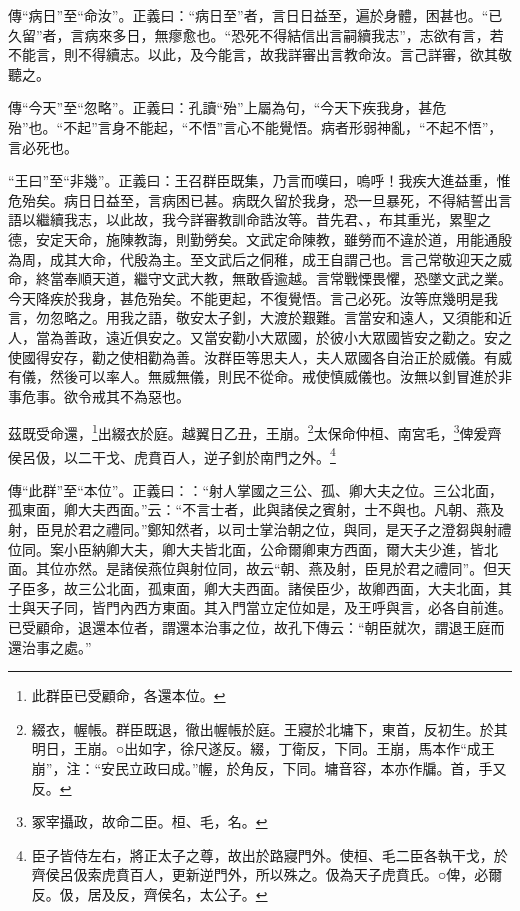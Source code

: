 {\noindent\zhuan{}\fzbyks 傳“病日”至“命汝”。正義曰：“病日至”者，言日日益至，遍於身體，困甚也。“已久留”者，言病來多日，無瘳愈也。“恐死不得結信出言嗣續我志”，志欲有言，若不能言，則不得續志。以此，及今能言，故我詳審出言教命汝。言己詳審，欲其敬聽之。 \par}

{\noindent\zhuan{}\fzbyks 傳“今天”至“忽略”。正義曰：孔讀“殆”上屬為句，“今天下疾我身，甚危殆”也。“不起”言身不能起，“不悟”言心不能覺悟。病者形弱神亂，“不起不悟”，言必死也。 \par}

{\noindent\shu{}\fzkt “王曰”至“非幾”。正義曰：王召群臣既集，乃言而嘆曰，嗚呼！我疾大進益重，惟危殆矣。病日日益至，言病困已甚。病既久留於我身，恐一旦暴死，不得結誓出言語以繼續我志，以此故，我今詳審教訓命誥汝等。昔先君、，布其重光，累聖之德，安定天命，施陳教誨，則勤勞矣。文武定命陳教，雖勞而不違於道，用能通殷為周，成其大命，代殷為主。至文武后之侗稚，成王自謂己也。言己常敬迎天之威命，終當奉順天道，繼守文武大教，無敢昏逾越。言常戰慄畏懼，恐墜文武之業。今天降疾於我身，甚危殆矣。不能更起，不復覺悟。言己必死。汝等庶幾明是我言，勿忽略之。用我之語，敬安太子釗，大渡於艱難。言當安和遠人，又須能和近人，當為善政，遠近俱安之。又當安勸小大眾國，於彼小大眾國皆安之勸之。安之使國得安存，勸之使相勸為善。汝群臣等思夫人，夫人眾國各自治正於威儀。有威有儀，然後可以率人。無威無儀，則民不從命。戒使慎威儀也。汝無以釗冒進於非事危事。欲令戒其不為惡也。 \par}

茲既受命還，\footnote{此群臣已受顧命，各還本位。}出綴衣於庭。越翼日乙丑，王崩。\footnote{綴衣，幄帳。群臣既退，徹出幄帳於庭。王寢於北墉下，東首，反初生。於其明日，王崩。○出如字，徐尺遂反。綴，丁衛反，下同。王崩，馬本作“成王崩”，注：“安民立政曰成。”幄，於角反，下同。墉音容，本亦作牖。首，手又反。}太保命仲桓、南宮毛，\footnote{冢宰攝政，故命二臣。桓、毛，名。}俾爰齊侯呂伋，以二干戈、虎賁百人，逆子釗於南門之外。\footnote{臣子皆侍左右，將正太子之尊，故出於路寢門外。使桓、毛二臣各執干戈，於齊侯呂伋索虎賁百人，更新逆門外，所以殊之。伋為天子虎賁氏。○俾，必爾反。伋，居及反，齊侯名，太公子。}


{\noindent\zhuan{}\fzbyks 傳“此群”至“本位”。正義曰：：“射人掌國之三公、孤、卿大夫之位。三公北面，孤東面，卿大夫西面。”云：“不言士者，此與諸侯之賓射，士不與也。凡朝、燕及射，臣見於君之禮同。”鄭知然者，以司士掌治朝之位，與同，是天子之澄芻與射禮位同。案小臣納卿大夫，卿大夫皆北面，公命爾卿東方西面，爾大夫少進，皆北面。其位亦然。是諸侯燕位與射位同，故云“朝、燕及射，臣見於君之禮同”。但天子臣多，故三公北面，孤東面，卿大夫西面。諸侯臣少，故卿西面，大夫北面，其士與天子同，皆門內西方東面。其入門當立定位如是，及王呼與言，必各自前進。已受顧命，退還本位者，謂還本治事之位，故孔下傳云：“朝臣就次，謂退王庭而還治事之處。” \par}

